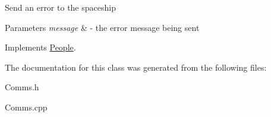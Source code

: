 Send an error to the spaceship 
\begin{DoxyParams}{Parameters}
{\em message} & -\/ the error message being sent \\
\hline
\end{DoxyParams}


Implements \hyperlink{classPeople_a572a35170f61d1848eb04b65baafb057}{People}.



The documentation for this class was generated from the following files\+:\begin{DoxyCompactItemize}
\item 
Comms.\+h\item 
Comms.\+cpp\end{DoxyCompactItemize}
